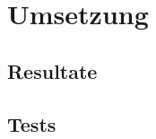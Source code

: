 \section{Umsetzung}\label{sec:umsetzung}

    \subsection{Resultate}

        
        
        
        

    \subsection{Tests}

        
        

    
